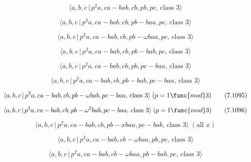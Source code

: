 \documentclass[10pt]{article}
\begin{document}
\begin{equation}
\langle a,b,c\,|\,p^2a,ca-bab,cb,pb,pc,\,\text{class }3\rangle  \tag{7.1089}
\end{equation}

\begin{equation}
\langle a,b,c\,|\,p^2a,ca-bab,cb,pb-baa,pc,\,\text{class }3\rangle 
\tag{7.1090}
\end{equation}

\begin{equation}
\langle a,b,c\,|\,p^{2}a,ca-bab,cb,pb-\omega baa,pc,\,\text{class }3\rangle 
\tag{7.1091}
\end{equation}

\begin{equation}
\langle a,b,c\,|\,p^2a,ca-bab,cb,pb-bab,pc,\,\text{class }3\rangle 
\tag{7.1092}
\end{equation}

\begin{equation}
\langle a,b,c\,|\,p^2a,ca-bab,cb,pb,pc-baa,\,\text{class }3\rangle 
\tag{7.1093}
\end{equation}

\begin{equation}
\langle a,b,c\,|\,p^2a,ca-bab,cb,pb-bab,pc-baa,\,\text{class }3\rangle 
\tag{7.1094}
\end{equation}

\begin{equation}
\langle a,b,c\,|\,p^{2}a,ca-bab,cb,pb-\omega bab,pc-baa,\,\text{class }%
3\rangle \;(p=1\func{mod}3)  \tag{7.1095}
\end{equation}

\begin{equation}
\langle a,b,c\,|\,p^{2}a,ca-bab,cb,pb-\omega ^{2}bab,pc-baa,\,\text{class }%
3\rangle \;(p=1\func{mod}3)  \tag{7.1096}
\end{equation}

\begin{equation}
\langle a,b,c\,|\,p^2a,ca-bab,cb,pb-xbaa,pc-bab,\,\text{class }3\rangle \;(%
\text{all }x)  \tag{7.1097}
\end{equation}

\begin{equation}
\langle a,b,c\,|\,p^{2}a,ca-bab,cb-\omega baa,pb,pc,\,\text{class }3\rangle 
\tag{7.1098}
\end{equation}

\begin{equation}
\langle a,b,c\,|\,p^{2}a,ca-bab,cb-\omega baa,pb-bab,pc,\,\text{class }%
3\rangle  \tag{7.1099}
\end{equation}
\end{document}
